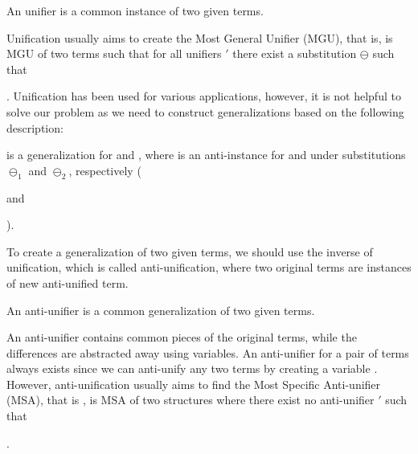 \begin{defn}[Unifier]\label{def:unifier} 
An unifier is a common instance of two given terms.
\end{defn} 

Unification usually aims to create the Most General Unifier (MGU), that is,  is MGU of two terms such that for all unifiers ${\prime}$ there exist a substitution $\ominus$ such that . Unification has been used for various applications, however, it is not helpful to solve our problem as we need to construct generalizations based on the following description:

\begin{defn}[Generalization]\label{def:generalization} 
 is a generalization for  and , where  is an anti-instance for   and  under substitutions $\ominus_1$ and $\ominus_2$, respectively ( and).
\end{defn}
To create a generalization of two given terms, we should use the inverse of unification, which is called anti-unification, where two original terms are instances of new anti-unified term. 

\begin{defn}\label{def:anti-unifier} 
An anti-unifier is a common generalization of two given terms.
\end{defn} 

An anti-unifier contains common pieces of the original terms, while the differences are abstracted away using variables. An anti-unifier for a pair of terms always exists since we can anti-unify any two terms by creating a variable . However, anti-unification usually aims to find the Most Specific Anti-unifier (MSA), that is ,  is MSA of two structures where there exist no anti-unifier ${\prime}$ such that.

